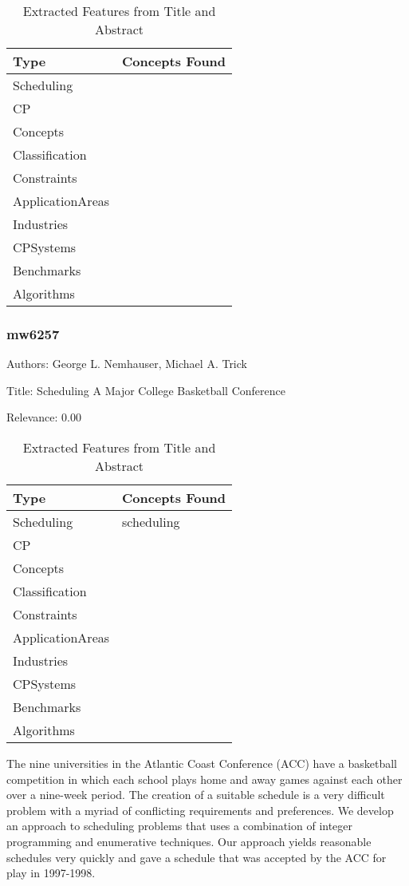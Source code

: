 {\scriptsize
\begin{longtable}{p{2cm}p{20cm}}
\caption{Extracted Features from Title and Abstract}\\ \toprule
Type & Concepts Found\\ \midrule
\endhead
\bottomrule
\endfoot
Scheduling & \\ 
CP & \\ 
Concepts & \\ 
Classification & \\ 
Constraints & \\ 
ApplicationAreas & \\ 
Industries & \\ 
CPSystems & \\ 
Benchmarks & \\ 
Algorithms & \\ 
\end{longtable}
}



\subsubsection{mw6257}
\label{mw:mw6257}

Authors: George L. Nemhauser, Michael A. Trick

Title: Scheduling A Major College Basketball Conference

Relevance:  0.00

{\scriptsize
\begin{longtable}{p{2cm}p{20cm}}
\caption{Extracted Features from Title and Abstract}\\ \toprule
Type & Concepts Found\\ \midrule
\endhead
\bottomrule
\endfoot
Scheduling & scheduling\\ 
CP & \\ 
Concepts & \\ 
Classification & \\ 
Constraints & \\ 
ApplicationAreas & \\ 
Industries & \\ 
CPSystems & \\ 
Benchmarks & \\ 
Algorithms & \\ 
\end{longtable}
}

  The nine universities in the Atlantic Coast Conference (ACC) have a basketball competition in which each school plays home and away games against each other over a nine-week period. The creation of a suitable schedule is a very difficult problem with a myriad of conflicting requirements and preferences. We develop an approach to scheduling problems that uses a combination of integer programming and enumerative techniques. Our approach yields reasonable schedules very quickly and gave a schedule that was accepted by the ACC for play in 1997-1998.  

